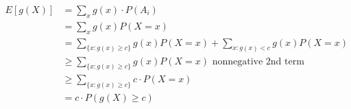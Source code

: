 \documentclass[class=article,crop=false]{standalone}
\begin{document}
\begin{prf}
\begin{align*}
	E[g(X)]&= \sum_x g(x) \cdot P(A_i) \\
	       &= \sum_x g(x) P(X=x) \\
	       &= \sum_{\{x:g(x)\geq c\} } g(x) P(X=x) + \sum_{x: g(x) < c} g(x) P(X=x)\\
	       &\geq   \sum_{\{x:g(x)\geq c\} } g(x) P(X=x) \text{ nonnegative 2nd term} \\
	       &\geq  \sum_{\{x:g(x)\geq c\} } c \cdot  P(X=x)  \\
	       &= c \cdot P(g(X) \geq c) \\
\end{align*}
\end{prf}
\end{document}
